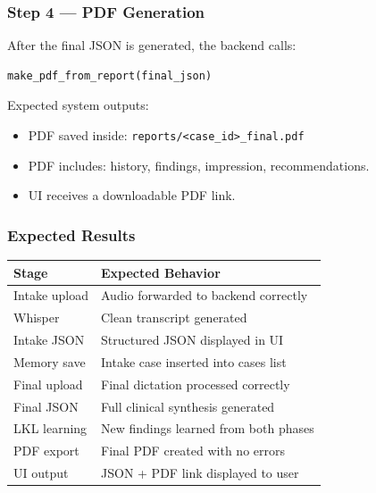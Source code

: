 \subsubsection*{Step 4 — PDF Generation}

After the final JSON is generated, the backend calls:

\begin{verbatim}
make_pdf_from_report(final_json)
\end{verbatim}

Expected system outputs:

\begin{itemize}
    \item PDF saved inside: \texttt{reports/<case\_id>\_final.pdf}
    \item PDF includes: history, findings, impression, recommendations.
    \item UI receives a downloadable PDF link.
\end{itemize}



\subsubsection*{Expected Results}

\begin{table}[H]
\centering
\renewcommand{\arraystretch}{1.3}
\begin{tabular}{|p{4cm}|p{9cm}|}
\hline
\textbf{Stage} & \textbf{Expected Behavior} \\ \hline
Intake upload & Audio forwarded to backend correctly \\ \hline
Whisper & Clean transcript generated \\ \hline
Intake JSON & Structured JSON displayed in UI \\ \hline
Memory save & Intake case inserted into cases list \\ \hline
Final upload & Final dictation processed correctly \\ \hline
Final JSON & Full clinical synthesis generated \\ \hline
LKL learning & New findings learned from both phases \\ \hline
PDF export & Final PDF created with no errors \\ \hline
UI output & JSON + PDF link displayed to user \\ \hline
\end{tabular}
\end{table}

